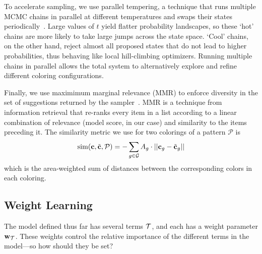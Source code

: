 To accelerate sampling, we use parallel tempering, a technique that runs multiple MCMC chains in parallel at different temperatures and swaps their states periodically~\cite{ParallelTempering}. Large values of $t$ yield flatter probability landscapes, so these `hot' chains are more likely to take large jumps across the state space. `Cool' chains, on the other hand, reject almost all proposed states that do not lead to higher probabilities, thus behaving like local hill-climbing optimizers. Running multiple chains in parallel allows the total system to alternatively explore and refine different coloring configurations.

Finally, we use maximimum marginal relevance (MMR) to enforce diversity in the set of suggestions returned by the sampler~\cite{MMR}. MMR is a technique from information retrieval that re-ranks every item in a list according to a linear combination of relevance (model score, in our case) and similarity to the items preceding it. The similarity metric we use for two colorings of a pattern $\mathcal{P}$ is
\begin{equation*}
\text{sim}(\mathbf{c}, \tilde{\mathbf{c}}, \mathcal{P}) = - \sum_{g \in \mathcal{G}} {A_g \cdot ||\mathbf{c}_g - \tilde{\mathbf{c}}_g||}
\end{equation*}
which is the area-weighted sum of \lab distances between the corresponding colors in each coloring.

\subsection{Weight Learning}
\label{sec:weights}

The model defined thus far has several terms $\mathcal{T}$, and each has a weight parameter $\mathbf{w}_{\mathcal{T}}$. These weights control the relative importance of the different terms in the model---so how should they be set?

